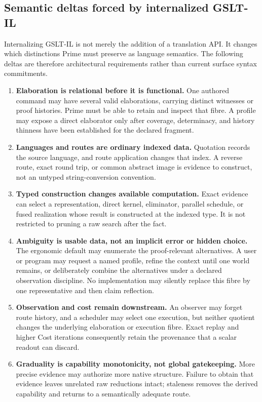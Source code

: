 \documentclass[11pt]{article}
\begin{document}
\subsection{Semantic deltas forced by internalized GSLT-IL}

Internalizing GSLT-IL is not merely the addition of a translation API.  It changes
which distinctions Prime must preserve as language semantics.  The following
deltas are therefore architectural requirements rather than current surface
syntax commitments.

\begin{enumerate}
\item \textbf{Elaboration is relational before it is functional.}
  One authored command may have several valid elaborations, carrying distinct
  witnesses or proof histories.  Prime must be able to retain and inspect that
  fibre.  A profile may expose a direct elaborator only after coverage,
  determinacy, and history thinness have been established for the declared
  fragment.
\item \textbf{Languages and routes are ordinary indexed data.}
  Quotation records the source language, and route application changes that
  index.  A reverse route, exact round trip, or common abstract image is evidence
  to construct, not an untyped string-conversion convention.
\item \textbf{Typed construction changes available computation.}
  Exact evidence can select a representation, direct kernel, eliminator,
  parallel schedule, or fused realization whose result is constructed at the
  indexed type.  It is not restricted to pruning a raw search after the fact.
\item \textbf{Ambiguity is usable data, not an implicit error or hidden choice.}
  The ergonomic default may enumerate the proof-relevant alternatives.  A user
  or program may request a named profile, refine the context until one world
  remains, or deliberately combine the alternatives under a declared
  observation discipline.  No implementation may silently replace this fibre
  by one representative and then claim reflection.
\item \textbf{Observation and cost remain downstream.}
  An observer may forget route history, and a scheduler may select one execution,
  but neither quotient changes the underlying elaboration or execution fibre.
  Exact replay and higher Cost iterations consequently retain the provenance
  that a scalar readout can discard.
\item \textbf{Graduality is capability monotonicity, not global gatekeeping.}
  More precise evidence may authorize more native structure.  Failure to obtain
  that evidence leaves unrelated raw reductions intact; staleness removes the
  derived capability and returns to a semantically adequate route.
\end{enumerate}
\end{document}

